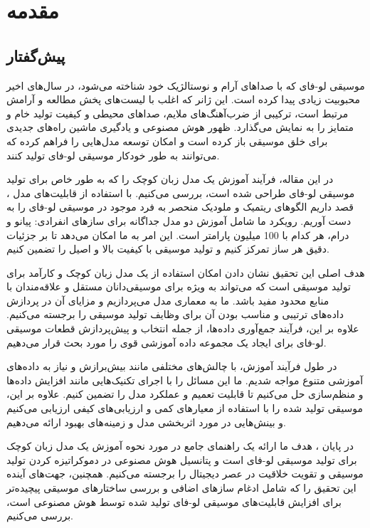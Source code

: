 \chapter{مقدمه}
\section{پیش‌گفتار}

موسیقی لو-فای که با صداهای آرام و نوستالژیک خود شناخته می‌شود، در سال‌های اخیر محبوبیت زیادی پیدا کرده است. این ژانر که اغلب با لیست‌های پخش مطالعه و آرامش مرتبط است، ترکیبی از ضرب‌آهنگ‌های ملایم، صداهای محیطی و کیفیت تولید خام و متمایز را به نمایش می‌گذارد. ظهور هوش مصنوعی  و یادگیری ماشین  راه‌های جدیدی برای خلق موسیقی باز کرده است و امکان توسعه مدل‌هایی را فراهم کرده که می‌توانند به طور خودکار موسیقی لو-فای تولید کنند.

در این مقاله، فرآیند آموزش یک مدل زبان کوچک را که به طور خاص برای تولید موسیقی لو-فای طراحی شده است، بررسی می‌کنیم. با استفاده از قابلیت‌های مدل ، قصد داریم الگوهای ریتمیک و ملودیک منحصر به فرد موجود در موسیقی لو-فای را به دست آوریم. رویکرد ما شامل آموزش دو مدل جداگانه برای سازهای انفرادی: پیانو و درام، هر کدام با 100 میلیون پارامتر است. این امر به ما امکان می‌دهد تا بر جزئیات دقیق هر ساز تمرکز کنیم و تولید موسیقی با کیفیت بالا و اصیل را تضمین کنیم.

هدف اصلی این تحقیق نشان دادن امکان استفاده از یک مدل زبان کوچک و کارآمد برای تولید موسیقی است که می‌تواند به ویژه برای موسیقی‌دانان مستقل و علاقه‌مندان با منابع محدود مفید باشد. ما به معماری مدل  می‌پردازیم و مزایای آن در پردازش داده‌های ترتیبی و مناسب بودن آن برای وظایف تولید موسیقی را برجسته می‌کنیم. علاوه بر این، فرآیند جمع‌آوری داده‌ها، از جمله انتخاب و پیش‌پردازش قطعات موسیقی لو-فای برای ایجاد یک مجموعه داده آموزشی قوی را مورد بحث قرار می‌دهیم.

در طول فرآیند آموزش، با چالش‌های مختلفی مانند بیش‌برازش و نیاز به داده‌های آموزشی متنوع مواجه شدیم. ما این مسائل را با اجرای تکنیک‌هایی مانند افزایش داده‌ها و منظم‌سازی حل می‌کنیم تا قابلیت تعمیم و عملکرد مدل را تضمین کنیم. علاوه بر این، موسیقی تولید شده را با استفاده از معیارهای کمی و ارزیابی‌های کیفی ارزیابی می‌کنیم و بینش‌هایی در مورد اثربخشی مدل و زمینه‌های بهبود ارائه می‌دهیم.

در پایان ، هدف ما ارائه یک راهنمای جامع در مورد نحوه آموزش یک مدل زبان کوچک برای تولید موسیقی لو-فای است و پتانسیل هوش مصنوعی در دموکراتیزه کردن تولید موسیقی و تقویت خلاقیت در عصر دیجیتال را برجسته می‌کنیم. همچنین، جهت‌های آینده این تحقیق را که شامل ادغام سازهای اضافی و بررسی ساختارهای موسیقی پیچیده‌تر برای افزایش قابلیت‌های موسیقی لو-فای تولید شده توسط هوش مصنوعی است، بررسی می‌کنیم.